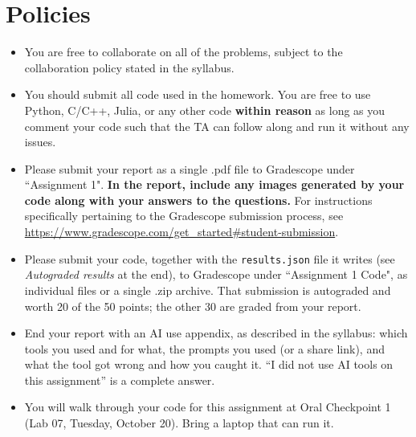 \newif\ifshowsolutions
\showsolutionsfalse

\usepackage[T1]{fontenc}
\usepackage{booktabs}
\setlength{\emergencystretch}{1.5em}



\pagestyle{fancy}

\section*{Policies}
\begin{itemize}
  \item You are free to collaborate on all of the problems, subject to the collaboration policy stated in the syllabus.
  \item You should submit all code used in the homework.
        You are free to use Python, C/C++, Julia, or any other code \textbf{within reason} as long as you comment your code such that the TA can follow along and run it without any issues.
  \item Please submit your report as a single .pdf file to Gradescope under ``Assignment 1".
        \textbf{In the report, include any images generated by your code along with your answers to the questions.}
        For instructions specifically pertaining to the Gradescope submission process, see \url{https://www.gradescope.com/get_started#student-submission}.
  \item Please submit your code, together with the \texttt{results.json} file it writes (see \emph{Autograded results} at the end), to Gradescope under ``Assignment 1 Code", as individual files or a single .zip archive.
        That submission is autograded and worth 20 of the 50 points; the other 30 are graded from your report.
  \item End your report with an AI use appendix, as described in the syllabus: which tools you used and for what, the prompts you used (or a share link), and what the tool got wrong and how you caught it.
        ``I did not use AI tools on this assignment'' is a complete answer.
  \item You will walk through your code for this assignment at Oral Checkpoint 1 (Lab 07, Tuesday, October 20).
        Bring a laptop that can run it.
\end{itemize}


